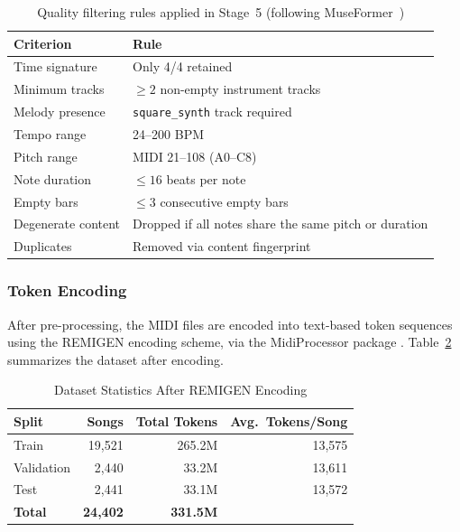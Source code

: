 \documentclass[conference]{IEEEtran}
\begin{document}
\begin{table}[htbp]
\centering
\caption{Quality filtering rules applied in Stage~5 (following MuseFormer~\cite{yu2022museformer})}
\label{tab:filter_rules}
\begin{tabular}{ll}
\toprule
\textbf{Criterion} & \textbf{Rule} \\
\midrule
Time signature     & Only 4/4 retained \\
Minimum tracks     & $\geq 2$ non-empty instrument tracks \\
Melody presence    & \texttt{square\_synth} track required \\
Tempo range        & 24--200 BPM \\
Pitch range        & MIDI 21--108 (A0--C8) \\
Note duration      & $\leq 16$ beats per note \\
Empty bars         & $\leq 3$ consecutive empty bars \\
Degenerate content & Dropped if all notes share the same pitch or duration \\
Duplicates         & Removed via content fingerprint \\
\bottomrule
\end{tabular}
\end{table}

\subsubsection{Token Encoding}
\label{sec:encoding}
After pre-processing, the MIDI files are encoded into text-based token sequences using the REMIGEN encoding scheme, via the MidiProcessor package \cite{yu2022museformer}.
Table~\ref{tab:dataset_stats} summarizes the dataset after encoding.

\begin{table}[htbp]
\centering
\caption{Dataset Statistics After REMIGEN Encoding}
\label{tab:dataset_stats}
\begin{tabular}{lrrr}
\toprule
\textbf{Split} & \textbf{Songs} & \textbf{Total Tokens} & \textbf{Avg.\ Tokens/Song} \\
\midrule
Train      & 19,521 & 265.2M & 13,575 \\
Validation &  2,440 &  33.2M & 13,611 \\
Test       &  2,441 &  33.1M & 13,572 \\
\midrule
\textbf{Total} & \textbf{24,402} & \textbf{331.5M} & \\
\bottomrule
\end{tabular}
\end{table}
\end{document}
